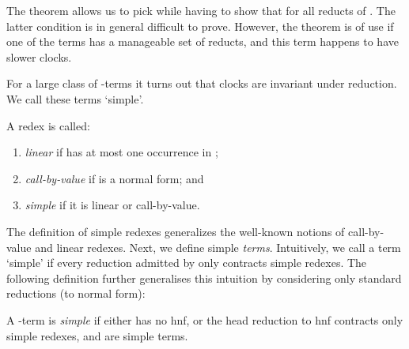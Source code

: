 \noindent
The theorem allows us to pick 
while having to show that  for all reducts  of .
The latter condition is in general difficult to prove.
However, the theorem is of use if one of the terms 
has a manageable set of reducts, and this term happens to have slower clocks.

For a large class of -terms it turns out that clocks are invariant under reduction.
We call these terms `simple'.
\begin{definition}
  A redex  is called:
  \begin{enumerate}\setlength{\itemsep}{0ex}
    \item \emph{linear} if  has at most one occurrence in ;
    \item \emph{call-by-value} if  is a normal form; and
    \item \emph{simple} if it is linear or call-by-value.
  \end{enumerate}
\end{definition}


The definition of simple redexes generalizes the well-known notions
of call-by-value and linear redexes. 
Next, we define simple \emph{terms}.
Intuitively, we call a term  `simple' if every reduction
admitted by  only contracts simple redexes.
The following definition further generalises this intuition by considering
only standard reductions (to normal form):
\begin{definition}
  A -term  is \emph{simple}
  if either  has no hnf, 
  or the head reduction to hnf 
  contracts only simple redexes,
  and  are simple terms.
\end{definition}

